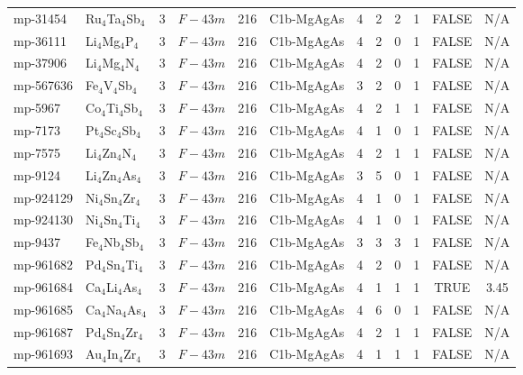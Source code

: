 {\begin{longtable}{llcccccccccc}
    mp-31454 & Ru$_{4}$Ta$_{4}$Sb$_{4}$ & 3     & $F-43m$ & 216   & C1b-MgAgAs & 4     & 2     & 2     & 1     & FALSE & N/A \\
    mp-36111 & Li$_{4}$Mg$_{4}$P$_{4}$ & 3     & $F-43m$ & 216   & C1b-MgAgAs & 4     & 2     & 0     & 1     & FALSE & N/A \\
    mp-37906 & Li$_{4}$Mg$_{4}$N$_{4}$ & 3     & $F-43m$ & 216   & C1b-MgAgAs & 4     & 2     & 0     & 1     & FALSE & N/A \\
    mp-567636 & Fe$_{4}$V$_{4}$Sb$_{4}$ & 3     & $F-43m$ & 216   & C1b-MgAgAs & 3     & 2     & 0     & 1     & FALSE & N/A \\
    mp-5967 & Co$_{4}$Ti$_{4}$Sb$_{4}$ & 3     & $F-43m$ & 216   & C1b-MgAgAs & 4     & 2     & 1     & 1     & FALSE & N/A \\
    mp-7173 & Pt$_{4}$Sc$_{4}$Sb$_{4}$ & 3     & $F-43m$ & 216   & C1b-MgAgAs & 4     & 1     & 0     & 1     & FALSE & N/A \\
    mp-7575 & Li$_{4}$Zn$_{4}$N$_{4}$ & 3     & $F-43m$ & 216   & C1b-MgAgAs & 4     & 2     & 1     & 1     & FALSE & N/A \\
    mp-9124 & Li$_{4}$Zn$_{4}$As$_{4}$ & 3     & $F-43m$ & 216   & C1b-MgAgAs & 3     & 5     & 0     & 1     & FALSE & N/A \\
    mp-924129 & Ni$_{4}$Sn$_{4}$Zr$_{4}$ & 3     & $F-43m$ & 216   & C1b-MgAgAs & 4     & 1     & 0     & 1     & FALSE & N/A \\
    mp-924130 & Ni$_{4}$Sn$_{4}$Ti$_{4}$ & 3     & $F-43m$ & 216   & C1b-MgAgAs & 4     & 1     & 0     & 1     & FALSE & N/A \\
    mp-9437 & Fe$_{4}$Nb$_{4}$Sb$_{4}$ & 3     & $F-43m$ & 216   & C1b-MgAgAs & 3     & 3     & 3     & 1     & FALSE & N/A \\
    mp-961682 & Pd$_{4}$Sn$_{4}$Ti$_{4}$ & 3     & $F-43m$ & 216   & C1b-MgAgAs & 4     & 2     & 0     & 1     & FALSE & N/A \\
    mp-961684 & Ca$_{4}$Li$_{4}$As$_{4}$ & 3     & $F-43m$ & 216   & C1b-MgAgAs & 4     & 1     & 1     & 1     & TRUE  & 3.45  \\
    mp-961685 & Ca$_{4}$Na$_{4}$As$_{4}$ & 3     & $F-43m$ & 216   & C1b-MgAgAs & 4     & 6     & 0     & 1     & FALSE & N/A \\
    mp-961687 & Pd$_{4}$Sn$_{4}$Zr$_{4}$ & 3     & $F-43m$ & 216   & C1b-MgAgAs & 4     & 2     & 1     & 1     & FALSE & N/A \\
    mp-961693 & Au$_{4}$In$_{4}$Zr$_{4}$ & 3     & $F-43m$ & 216   & C1b-MgAgAs & 4     & 1     & 1     & 1     & FALSE & N/A \\

\end{longtable}}
